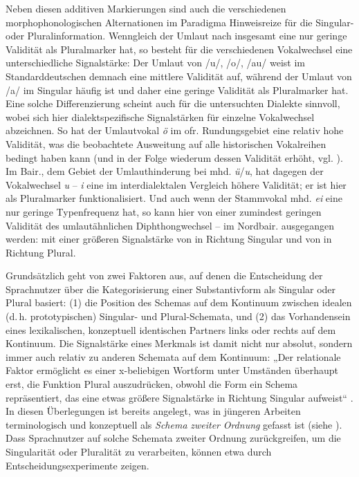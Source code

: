 Neben diesen additiven Markierungen sind auch die verschiedenen morphophonologischen Alternationen im Paradigma Hinweisreize für die Singular- oder Pluralinformation. Wenngleich der Umlaut nach \citet[84]{Köpcke1993} insgesamt eine nur geringe Validität als Pluralmarker hat, so besteht für die verschiedenen Vokalwechsel eine unterschiedliche Signalstärke: Der Umlaut von /u/, /o/, /au/ weist im Standarddeutschen demnach eine mittlere Validität auf, während der Umlaut von /a/ im Singular häufig ist und daher eine geringe Validität als Pluralmarker hat. Eine solche Differenzierung scheint auch für die untersuchten Dialekte sinnvoll, wobei sich hier dialektspezifische Signalstärken für einzelne Vokalwechsel abzeichnen. So hat der Umlautvokal \textit{ö} im ofr. Rundungsgebiet eine relativ hohe Validität, was die beobachtete Ausweitung auf alle historischen Vokalreihen bedingt haben kann (und in der Folge wiederum dessen Validität erhöht, vgl. ). Im Bair., dem Gebiet der Umlauthinderung bei mhd. \textit{ü}/\textit{u}, hat dagegen der Vokalwechsel \textit{u} -- \textit{i} eine im interdialektalen Vergleich höhere Validität; er ist hier als Pluralmarker funktionalisiert. Und auch wenn der Stammvokal mhd. \textit{ei} eine nur geringe Typenfrequenz hat, so kann hier von einer zumindest geringen Validität des umlautähnlichen Diphthongwechsel  --  im Nordbair. ausgegangen werden: mit einer größeren Signalstärke von  in Richtung Singular und von  in Richtung Plural.

Grundsätzlich geht \citet[88]{Köpcke1993} von zwei Faktoren aus, auf denen die Entscheidung der Sprachnutzer über die Kategorisierung einer Substantivform als Singular oder Plural basiert: (1) die Position des Schemas auf dem Kontinuum zwischen idealen (d.\,h. prototypischen) Singular- und Plural-Schemata, und (2) das Vorhandensein eines lexikalischen, konzeptuell identischen Partners links oder rechts auf dem Kontinuum. Die Signalstärke eines Merkmals ist damit nicht nur absolut, sondern immer auch relativ zu anderen Schemata auf dem Kontinuum: „Der relationale Faktor ermöglicht es einer x-beliebigen Wortform unter Umständen überhaupt erst, die Funktion Plural auszudrücken, obwohl die Form ein Schema repräsentiert, das eine etwas größere Signalstärke in Richtung Singular aufweist“ \citep[89]{Köpcke1993}. In diesen Überlegungen ist bereits angelegt, was in jüngeren Arbeiten terminologisch und konzeptuell als \textit{Schema} \textit{zweiter} \textit{Ordnung} gefasst ist (siehe ). Dass Sprachnutzer auf solche Schemata zweiter Ordnung zurückgreifen, um die Singularität oder Pluralität zu verarbeiten, können etwa \citet{KöpckeEtAl2021} durch Entscheidungsexperimente zeigen.

